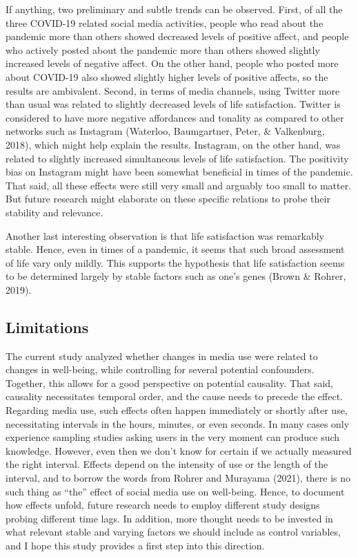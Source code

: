 \documentclass[
  english,
  man,mask,floatsintext]{apa6}
\begin{document}
If anything, two preliminary and subtle trends can be observed.
First, of all the three COVID-19 related social media activities, people who read about the pandemic more than others showed decreased levels of positive affect, and people who actively posted about the pandemic more than others showed slightly increased levels of negative affect.
On the other hand, people who posted more about COVID-19 also showed slightly higher levels of positive affects, so the results are ambivalent.
Second, in terms of media channels, using Twitter more than usual was related to slightly decreased levels of life satisfaction.
Twitter is considered to have more negative affordances and tonality as compared to other networks such as Instagram (Waterloo, Baumgartner, Peter, \& Valkenburg, 2018), which might help explain the results.
Instagram, on the other hand, was related to slightly increased simultaneous levels of life satisfaction.
The positivity bias on Instagram might have been somewhat beneficial in times of the pandemic.
That said, all these effects were still very small and arguably too small to matter.
But future research might elaborate on these specific relations to probe their stability and relevance.

Another last interesting observation is that life satisfaction was remarkably stable.
Hence, even in times of a pandemic, it seems that such broad assessment of life vary only mildly.
This supports the hypothesis that life satisfaction seems to be determined largely by stable factors such as one's genes (Brown \& Rohrer, 2019).

\hypertarget{limitations}{%
\subsection{Limitations}\label{limitations}}

The current study analyzed whether changes in media use were related to changes in well-being, while controlling for several potential confounders.
Together, this allows for a good perspective on potential causality.
That said, causality necessitates temporal order, and the cause needs to precede the effect.
Regarding media use, such effects often happen immediately or shortly after use, necessitating intervals in the hours, minutes, or even seconds.
In many cases only experience sampling studies asking users in the very moment can produce such knowledge.
However, even then we don't know for certain if we actually measured the right interval.
Effects depend on the intensity of use or the length of the interval, and to borrow the words from Rohrer and Murayama (2021), there is no such thing as ``the'' effect of social media use on well-being.
Hence, to document how effects unfold, future research needs to employ different study designs probing different time lags.
In addition, more thought needs to be invested in what relevant stable and varying factors we should include as control variables, and I hope this study provides a first step into this direction.
\end{document}
